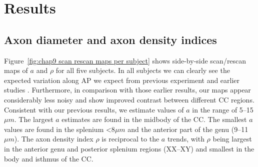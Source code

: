 \section{Results}
\subsection*{Axon diameter and axon density indices}
Figure~\ref{fig:chap9 scan rescan maps per subject} shows side-by-side scan/rescan maps of $a$ and $\rho$ for all five subjects. In all subjects we can clearly see the expected variation along AP we expect from previous experiment and earlier studies \citep{Alexander:2010}. Furthermore, in comparison with those earlier results, our maps appear considerably less noisy and show improved contrast between different CC regions. Consistent with our previous results, we estimate values of $a$ in the range of 5--15$\mu m$. The largest $a$ estimates are found in the midbody of the CC. The smallest $a$ values are found in the splenium <8$\mu m$ and the anterior part of the genu (9--11$\mu m$). The axon density index $\rho$ is reciprocal to the $a$ trends, with $\rho$ being largest in the anterior genu and posterior splenium regions  (XX--XY) and smallest in the body and isthmus of the CC. 

